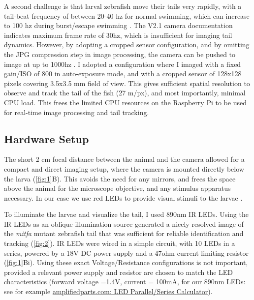 \documentclass[9pt,lineno]{RandlettLab_elife}
\begin{document}
A second challenge is that larval zebrafish move their tails very rapidly, with a tail-beat frequency of between 20-40 hz for normal swimming, which can increase to 100 hz during burst/escape swimming \citep{Budick2000-bq, Muller2004-st, Severi2014-iw}. The V2.1 camera documentation indicates maximum frame rate of 30hz, which is insufficient for imaging tail dynamics. However, by adopting a cropped sensor configuration, and by omitting the JPG compression step in image processing, the camera can be pushed to image at up to 1000hz \citep{660hz}. I adopted a configuration where I imaged with a fixed gain/ISO of 800 in auto-exposure mode, and with a cropped sensor of 128x128 pixels covering 3.5x3.5 mm field of view. This gives sufficient spatial resolution to observe and track the tail of the fish (27 \micro m/px), and most importantly, minimal CPU load. This frees the limited CPU resources on the Raspberry Pi to be used for real-time image processing and tail tracking. 

\subsection{Hardware Setup}

The short 2 cm focal distance between the animal and the camera allowed for a compact and direct imaging setup, where the camera is mounted directly below the larva (\autoref{fig:1}B). This avoids the need for any mirrors, and frees the space above the animal for the microscope objective, and any stimulus apparatus necessary. In our case we use red LEDs to provide visual stimuli to the larvae \citep{Lamire2023-di}. 

To illuminate the larvae and visualize the tail, I used 890nm IR LEDs. Using the IR LEDs as an oblique illumination source generated a nicely resolved image of the \textit{mitfa} mutant zebrafish tail that was sufficient for reliable identification and tracking (\autoref{fig:2}). IR LEDs were wired in a simple circuit, with 10 LEDs in a series, powered by a 18V DC power supply and a 47ohm current limiting resistor (\autoref{fig:1}Bi). Using these exact Voltage/Resistance configurations is not important, provided a relevant power supply and resistor are chosen to match the LED characteristics (forward voltage =1.4V, current = 100mA, for our 890nm LEDs: see for example \href{https://www.amplifiedparts.com/tech-articles/led-parallel-series-calculator}{amplifiedparts.com: LED Parallel/Series Calculator}). 
\end{document}
